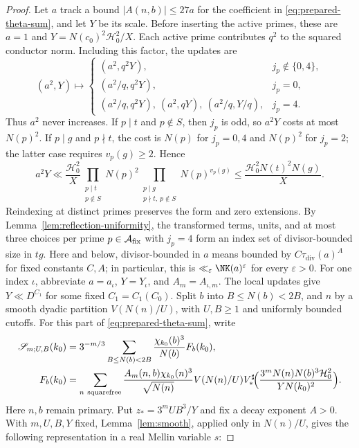 \begin{proof}
Let $a$ track a bound $|A(n,b)|\le27a$ for the coefficient in
\eqref{eq:prepared-theta-sum}, and let $Y$ be its scale.
Before inserting the active primes, these are $a=1$ and
$Y=N(c_0)^2\mathcal H_0^2/X$.
Each active prime contributes $q^2$ to the squared conductor norm.
Including this factor, the updates are
\[
 (a^2,Y)\longmapsto
 \begin{cases}
 (a^2,q^2Y),&j_p\notin\{0,4\},\\
 (a^2/q,q^2Y),&j_p=0,\\
 (a^2/q,q^2Y),\ (a^2,qY),\ (a^2/q,Y/q),&j_p=4.
 \end{cases}
\]
Thus $a^2$ never increases. If $p\mid t$ and $p\notin S$, then
$j_p$ is odd, so $a^2Y$ costs at most $N(p)^2$.
If $p\mid g$ and $p\nmid t$, the cost is
$N(p)$ for $j_p=0,4$ and $N(p)^2$ for $j_p=2$; the latter case
requires $v_p(g)\ge2$. Hence
\[
 a^2Y\ll\frac{\mathcal H_0^2}{X}
 \prod_{\substack{p\mid t\\p\notin S}}N(p)^2
 \prod_{\substack{p\mid g\\p\nmid t,\ p\notin S}}N(p)^{v_p(g)}
 \le\frac{\mathcal H_0^2N(t)^2N(g)}X.
\]
Reindexing at distinct primes preserves the form and zero extensions.
By %
Lemma~\ref{lem:reflection-uniformity}, the transformed terms, units,
and at most three choices per prime $p\in\mathcal A_{\rm fix}$ with $j_p=4$ form an index set
of divisor-bounded size in $tg$. Here and below, divisor-bounded in $a$ means bounded by $C\tau_{\mathrm{div}}(a)^A$ for fixed constants $C,A$; in particular, this is $\ll_\varepsilon\NK(a)^\varepsilon$ for every $\varepsilon>0$.
For one index $\iota$, abbreviate
$a=a_\iota$, $Y=Y_\iota$, and $A_m=A_{\iota,m}$.
The local updates give $Y\ll D^{C_1}$ for some fixed $C_1=C_1(C_0)$.
Split $b$ into $B\le N(b)<2B$, and $n$ by a smooth dyadic
partition $V(N(n)/U)$, with $U,B\ge1$ and uniformly bounded cutoffs.
For this part of \eqref{eq:prepared-theta-sum}, write
\[
 \begin{aligned}
 \mathscr S_{m;U,B}(k_0)
 &=3^{-m/3}\sum_{B\le N(b)<2B}\frac{\chi_{k_0}(b)^3}{N(b)}F_b(k_0),\\
 F_b(k_0)
 &=\sum_{n\ {\rm squarefree}}
 \frac{A_m(n,b)\chi_{k_0}(n)^3}{\sqrt{N(n)}}V(N(n)/U)
 V_*^\sharp\!\Bigl(\frac{3^mN(n)N(b)^3\mathcal H_0^2}
                         {YN(k_0)^2}\Bigr).
 \end{aligned}
\]
Here $n,b$ remain primary. Put $z_*=3^mUB^3/Y$ and fix a decay
exponent $A>0$. With $m,U,B,Y$ fixed, Lemma~\ref{lem:smooth},
applied only in $N(n)/U$, gives the following representation in a
real Mellin variable $s$:

\end{proof}
